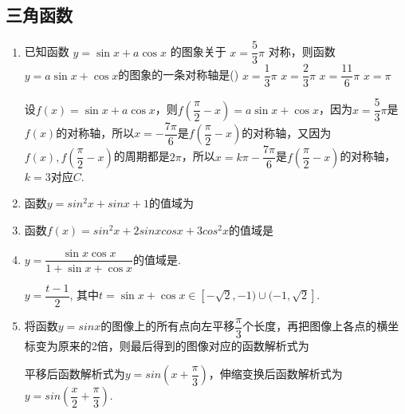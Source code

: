 \subsection*{三角函数}
\begin{enumerate}
    \item 已知函数 $y=\sin x+a \cos x$ 的图象关于 $x=\dfrac{5}{3} \pi$ 对称，则函数 $y=a \sin x+\cos x$的图象的一条对称轴是\dotfill()
    \xx
    {$x=\dfrac{1}{3} \pi$}
    {$x=\dfrac{2}{3} \pi$}
    {$x=\dfrac{11}{6} \pi$}
    {$x=\pi$}
    \begin{jieda}
        设$f(x) = \sin x+a \cos x$，则$f\left(\dfrac{\pi}{2} - x\right) = a \sin x+\cos x$，因为$x=\dfrac{5}{3} \pi$是$f(x)$的对称轴，所以$x = -\dfrac{7\pi}{6}$是$f\left(\dfrac{\pi}{2} - x\right)$的对称轴，又因为$f(x), f\left(\dfrac{\pi}{2} - x\right) $的周期都是$2\pi$，所以$x = k\pi - \dfrac{7\pi}{6}$是$f\left(\dfrac{\pi}{2} - x\right) $的对称轴，$k = 3$对应$C.$
    \end{jieda}

    \item 函数$y = sin^2x + sinx + 1$的值域为
    
    \item 函数$f(x) = sin^2x + 2sinx cosx + 3cos^2x$的值域是
    
    \item $y=\dfrac{\sin{x}\cos{x}}{1+\sin{x}+\cos{x}}$的值域是. 
    \begin{jieda}
    $y=\dfrac{t-1}{2}$, 其中$t=\sin{x}+\cos{x}\in[-\sqrt{2},-1)\cup(-1,\sqrt{2}]$. 
    \end{jieda}
    
    \item 将函数$y = sinx$的图像上的所有点向左平移$\dfrac{\pi}{3}$个长度，再把图像上各点的横坐标变为原来的2倍，则最后得到的图像对应的函数解析式为
    \begin{jieda}
        平移后函数解析式为$y = sin(x + \dfrac{\pi}{3})$，伸缩变换后函数解析式为$y = sin(\dfrac{x}{2}+\dfrac{\pi}{3})$.
    \end{jieda}


\end{enumerate}
